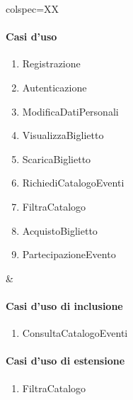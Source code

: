 \begin{table}[!hbp]
	\centering
	\begin{tblr}{colspec=XX}
		\begin{minipage}[t]{\linewidth}
			\paragraph{Casi d'uso}
			\begin{enumerate}
				\item Registrazione 
				\item Autenticazione
				\item ModificaDatiPersonali
				\item VisualizzaBiglietto
				\item ScaricaBiglietto
				\item RichiediCatalogoEventi
				\item FiltraCatalogo
				\item AcquistoBiglietto
				\item PartecipazioneEvento
			\end{enumerate}
		\end{minipage} &
		\begin{minipage}[t]{\linewidth}
			\paragraph{Casi d'uso di inclusione}
			\begin{enumerate}
                \item ConsultaCatalogoEventi
			\end{enumerate}
			\paragraph{Casi d'uso di estensione}
			\begin{enumerate}
				\item FiltraCatalogo
			\end{enumerate}
		\end{minipage}
	\end{tblr}
\end{table}
